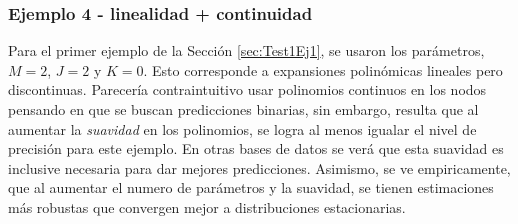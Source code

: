 \documentclass[../Main/Main.tex]{subfiles}
\begin{document}
\subsubsection*{Ejemplo 4 - linealidad + continuidad}
Para el primer ejemplo de la Sección \ref{sec:Test1Ej1}, se usaron los parámetros, $M = 2$, $J = 2$ y $K = 0$. Esto corresponde a expansiones polinómicas lineales pero discontinuas. Parecería contraintuitivo usar polinomios continuos en los nodos pensando en que se buscan predicciones binarias, sin embargo, resulta que al aumentar la \textit{suavidad} en los polinomios, se logra al menos igualar el nivel de precisión para este ejemplo. En otras bases de datos se verá que esta suavidad es inclusive necesaria para dar mejores predicciones. Asimismo, se ve empiricamente, que al aumentar el numero de parámetros y la suavidad, se tienen estimaciones más robustas que convergen mejor a distribuciones estacionarias.\\
\end{document}
